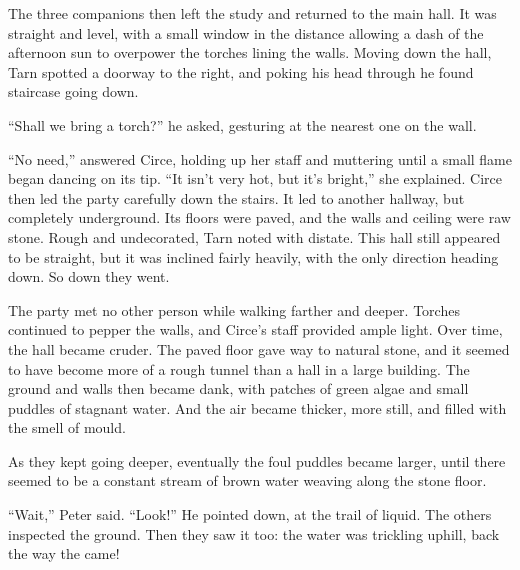 The three companions then left the study and returned to the main hall.  It was straight and level, with a small window in the distance allowing a dash of the afternoon sun to overpower the torches lining the walls.  Moving down the hall, Tarn spotted a doorway to the right, and poking his head through he found staircase going down.

``Shall we bring a torch?'' he asked, gesturing at the nearest one on the wall.

``No need,'' answered Circe, holding up her staff and muttering until a small flame began dancing on its tip.  ``It isn't very hot, but it's bright,'' she explained.  Circe then led the party carefully down the stairs.  It led to another hallway, but completely underground.  Its floors were paved, and the walls and ceiling were raw stone.  Rough and undecorated, Tarn noted with distate.  This hall still appeared to be straight, but it was inclined fairly heavily, with the only direction heading down.  So down they went.

The party met no other person while walking farther and deeper.  Torches continued to pepper the walls, and Circe's staff provided ample light.  Over time, the hall became cruder.  The paved floor gave way to natural stone, and it seemed to have become more of a rough tunnel than a hall in a large building.  The ground and walls then became dank, with patches of green algae and small puddles of stagnant water.  And the air became thicker, more still, and filled with the smell of mould.

As they kept going deeper, eventually the foul puddles became larger, until there seemed to be a constant stream of brown water weaving along the stone floor.

``Wait,'' Peter said.  ``Look!''  He pointed down, at the trail of liquid.  The others inspected the ground.  Then they saw it too: the water was trickling uphill, back the way the came!